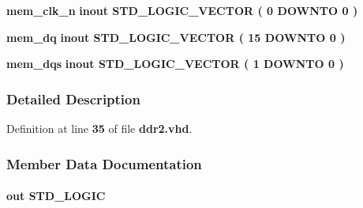 \begin{DoxyCompactItemize}
\item 
{\bf mem\+\_\+clk\+\_\+n}  {\bfseries {\bfseries \textcolor{keywordflow}{inout}\textcolor{vhdlchar}{ }}} {\bfseries \textcolor{comment}{S\+T\+D\+\_\+\+L\+O\+G\+I\+C\+\_\+\+V\+E\+C\+T\+OR}\textcolor{vhdlchar}{ }\textcolor{vhdlchar}{(}\textcolor{vhdlchar}{ }\textcolor{vhdlchar}{ } \textcolor{vhdldigit}{0} \textcolor{vhdlchar}{ }\textcolor{keywordflow}{D\+O\+W\+N\+TO}\textcolor{vhdlchar}{ }\textcolor{vhdlchar}{ } \textcolor{vhdldigit}{0} \textcolor{vhdlchar}{ }\textcolor{vhdlchar}{)}\textcolor{vhdlchar}{ }} 
\item 
{\bf mem\+\_\+dq}  {\bfseries {\bfseries \textcolor{keywordflow}{inout}\textcolor{vhdlchar}{ }}} {\bfseries \textcolor{comment}{S\+T\+D\+\_\+\+L\+O\+G\+I\+C\+\_\+\+V\+E\+C\+T\+OR}\textcolor{vhdlchar}{ }\textcolor{vhdlchar}{(}\textcolor{vhdlchar}{ }\textcolor{vhdlchar}{ } \textcolor{vhdldigit}{15} \textcolor{vhdlchar}{ }\textcolor{keywordflow}{D\+O\+W\+N\+TO}\textcolor{vhdlchar}{ }\textcolor{vhdlchar}{ } \textcolor{vhdldigit}{0} \textcolor{vhdlchar}{ }\textcolor{vhdlchar}{)}\textcolor{vhdlchar}{ }} 
\item 
{\bf mem\+\_\+dqs}  {\bfseries {\bfseries \textcolor{keywordflow}{inout}\textcolor{vhdlchar}{ }}} {\bfseries \textcolor{comment}{S\+T\+D\+\_\+\+L\+O\+G\+I\+C\+\_\+\+V\+E\+C\+T\+OR}\textcolor{vhdlchar}{ }\textcolor{vhdlchar}{(}\textcolor{vhdlchar}{ }\textcolor{vhdlchar}{ } \textcolor{vhdldigit}{1} \textcolor{vhdlchar}{ }\textcolor{keywordflow}{D\+O\+W\+N\+TO}\textcolor{vhdlchar}{ }\textcolor{vhdlchar}{ } \textcolor{vhdldigit}{0} \textcolor{vhdlchar}{ }\textcolor{vhdlchar}{)}\textcolor{vhdlchar}{ }} 
\end{DoxyCompactItemize}


\subsubsection{Detailed Description}


Definition at line {\bf 35} of file {\bf ddr2.\+vhd}.



\subsubsection{Member Data Documentation}
\paragraph[{aux\+\_\+full\+\_\+rate\+\_\+clk}]{ {\bfseries \textcolor{keywordflow}{out}\textcolor{vhdlchar}{ }} {\bfseries \textcolor{comment}{S\+T\+D\+\_\+\+L\+O\+G\+IC}\textcolor{vhdlchar}{ }} \hspace{0.3cm}{\ttfamily [Port]}}\label{classddr2_a36d0d46bf0f1e63ff4a37da4258f45ae}


